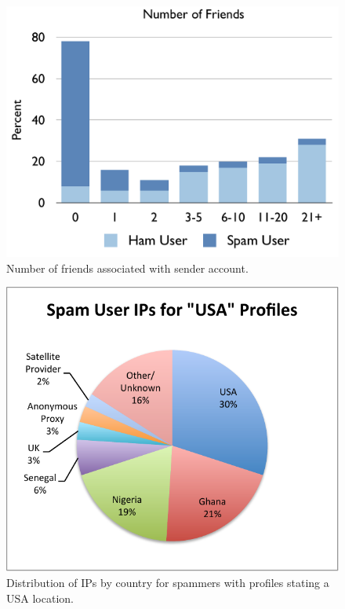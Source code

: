 \documentclass[preprint]{acm_proc_article-sp}
\begin{document}
\begin{figure}[h]
    \centering
    \includegraphics[width=\linewidth]{figures/friends.pdf}
    \caption{Number of friends associated with sender account.}
    \label{fig:friends}
\end{figure}

\begin{figure}[h]
    \centering
    \includegraphics[width=\linewidth]{figures/ips-usa-spam.pdf}
    \caption{Distribution of IPs by country for spammers with profiles stating a USA location.}
    \label{fig:usaspam}
\end{figure}
\end{document}
